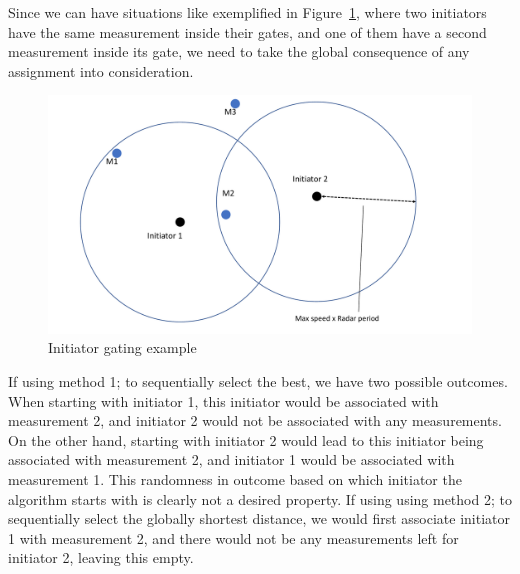 Since we can have situations like exemplified in Figure~\ref{fig:init_gating}, where two initiators have the same measurement inside their gates, and one of them have a second measurement inside its gate, we need to take the global consequence of any assignment into consideration.
\begin{figure}[H]
\centering
\includegraphics[width = .8\textwidth]{Figures/init_gating.pdf}
\caption{Initiator gating example}\label{fig:init_gating}
\end{figure}
If using method 1; to sequentially select the best, we have two possible outcomes. When starting with initiator 1, this initiator would be associated with measurement 2, and initiator 2 would not be associated with any measurements. On the other hand, starting with initiator 2 would lead to this initiator being associated with measurement 2, and initiator 1 would be associated with measurement 1. This randomness in outcome based on which initiator the algorithm starts with is clearly not a desired property. If using using method 2; to sequentially select the globally shortest distance, we would first associate initiator 1 with measurement 2, and there would not be any measurements left for initiator 2, leaving this empty.


